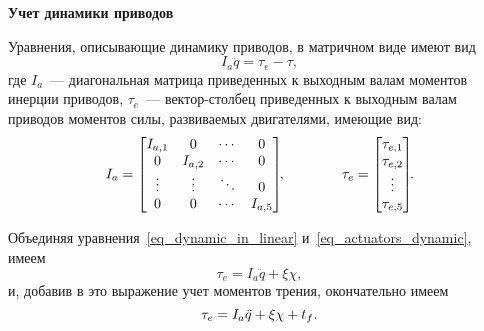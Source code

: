 \textbf{Учет динамики приводов}

Уравнения, описывающие динамику приводов, в матричном виде имеют вид
\begin{equation}\label{eq_actuators_dynamic}
	I_a \ddot{q} = \tau_e - \tau,
\end{equation}
где $I_a$~--- диагональная матрица приведенных к выходным валам моментов инерции приводов, $\tau_e$~--- вектор-столбец приведенных к выходным валам приводов моментов силы, развиваемых двигателями, имеющие вид:
\begin{equation}
	I_a =
	\begin{bmatrix}
		I_{a,1} & 0 & \cdots & 0 \\
		0 & I_{a,2} & \cdots & 0 \\
		\vdots & \vdots & \ddots & 0 \\
		0 & 0 & \cdots & I_{a,5}
	\end{bmatrix}\!\!,
	\qquad \qquad
	\tau_e =
	\begin{bmatrix}
		\tau_{e,1} \\ \tau_{e,2} \\ \vdots \\ \tau_{e,5}
	\end{bmatrix}\!\!\ldotp
\end{equation}

Объединяя уравнения~\eqref{eq_dynamic_in_linear} и~\eqref{eq_actuators_dynamic}, имеем 
\begin{equation}
	\tau_e = I_a \ddot{q} + \xi \chi,
\end{equation}
и, добавив в это выражение учет моментов трения, окончательно имеем
\begin{equation}\label{eq_eqs_with_tau_f}
	\tau_e = I_a \ddot{q} + \xi \chi + t_f \ldotp
\end{equation}

